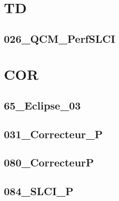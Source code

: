 \section{TD}

\subsection{026\_QCM\_PerfSLCI}
\graphicspath{{../06-Correction des Systèmes asservis/TD/026_QCM_PerfSLCI/images/}{../06-Correction des Systèmes asservis/TD/026_QCM_PerfSLCI/}{../Style/png/}}


\section{COR}

\subsection{65\_Eclipse\_03}
\graphicspath{{../06-Correction des Systèmes asservis/TD/COR/AP/65_Eclipse_03/images/}{../06-Correction des Systèmes asservis/TD/COR/AP/65_Eclipse_03/}{../Style/png/}}


\subsection{031\_Correcteur\_P}
\graphicspath{{../06-Correction des Systèmes asservis/TD/COR/P/031_Correcteur_P/images/}{../06-Correction des Systèmes asservis/TD/COR/P/031_Correcteur_P/}{../Style/png/}}


\subsection{080\_CorrecteurP}
\graphicspath{{../06-Correction des Systèmes asservis/TD/COR/P/080_CorrecteurP/images/}{../06-Correction des Systèmes asservis/TD/COR/P/080_CorrecteurP/}{../Style/png/}}


\subsection{084\_SLCI\_P}
\graphicspath{{../06-Correction des Systèmes asservis/TD/COR/P/084_SLCI_P/images/}{../06-Correction des Systèmes asservis/TD/COR/P/084_SLCI_P/}{../Style/png/}}


